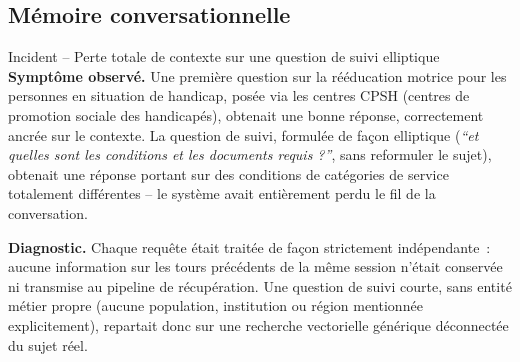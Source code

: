 \subsection{Mémoire conversationnelle}
\label{sec:memoire}

\begin{probbox}{Incident -- Perte totale de contexte sur une question de suivi elliptique}
\textbf{Symptôme observé.} Une première question sur la rééducation motrice pour les personnes en situation de handicap, posée via les centres CPSH (centres de promotion sociale des handicapés), obtenait une bonne réponse, correctement ancrée sur le contexte. La question de suivi, formulée de façon elliptique (\emph{``et quelles sont les conditions et les documents requis ?''}, sans reformuler le sujet), obtenait une réponse portant sur des conditions de catégories de service totalement différentes -- le système avait entièrement perdu le fil de la conversation.

\textbf{Diagnostic.} Chaque requête était traitée de façon strictement indépendante~: aucune information sur les tours précédents de la même session n'était conservée ni transmise au pipeline de récupération. Une question de suivi courte, sans entité métier propre (aucune population, institution ou région mentionnée explicitement), repartait donc sur une recherche vectorielle générique déconnectée du sujet réel.


\end{probbox}
